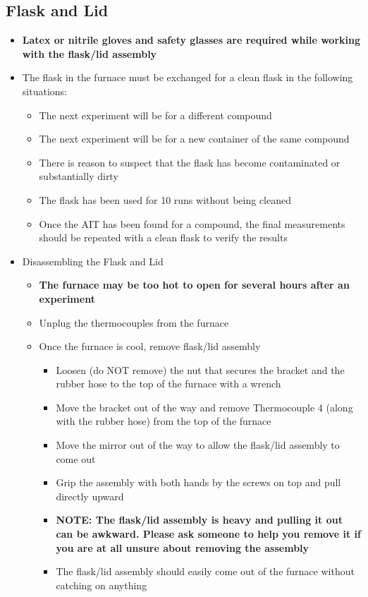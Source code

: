 \documentclass[letterpaper,11pt]{article}
\begin{document}
    \subsection{Flask and Lid}
    \begin{itemize}
    \item \textbf{Latex or nitrile gloves and safety glasses are 
            required while working with the flask/lid assembly}
    \item The flask in the furnace must be exchanged for a clean flask in the 
        following situations:
        \begin{itemize}
        \item The next experiment will be for a different compound
        \item The next experiment will be for a new container of the same 
            compound
        \item There is reason to suspect that the flask has become 
            contaminated or substantially dirty
        \item The flask has been used for 10 runs without being cleaned
        \item Once the AIT has been found for a compound, the final measurements
            should be repeated with a clean flask to verify the results
        \end{itemize}
    
    \item Disassembling the Flask and Lid
        \begin{itemize}
        \item \textbf{The furnace may be too hot to open for several hours after
             an experiment}
        \item Unplug the thermocouples from the furnace
        \item Once the furnace is cool, remove flask/lid assembly
            \begin{itemize}
            \item Loosen (do NOT remove) the nut that secures the bracket and 
                the rubber hose to the top of the furnace with a wrench
            \item Move the bracket out of the way and remove Thermocouple 4 
                (along with the rubber hose) from the top of the furnace
            \item Move the mirror out of the way to allow the flask/lid assembly
                to come out
            \item Grip the assembly with both hands by the screws on top and 
                pull directly upward
            \item \textbf{NOTE: The flask/lid assembly is heavy and pulling it  
                out can be awkward. Please ask someone to help you remove it 
                if you are at all unsure about removing the assembly}
            \item The flask/lid assembly should easily come out of the furnace 
                without catching on anything
            \end{itemize}
        

\end{itemize}
\end{itemize}
\end{document}
